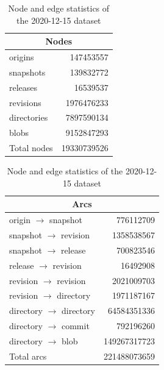\begin{table}
  \centering
  \caption{Node and edge statistics of the 2020-12-15 dataset}
  \label{tab:corpus-stats}
  \begin{tabular}[t]{l|r}
    \multicolumn{2}{c}{\textbf{Nodes}} \\
    \hline\hline
    origins     & \num{147453557} \\
    snapshots   & \num{139832772} \\
    releases    & \num{16539537} \\
    revisions   & \num{1976476233} \\
    directories & \num{7897590134} \\
    blobs       & \num{9152847293} \\
    \hline
    Total nodes & \num{19330739526} \\
  \end{tabular}
  \hspace{5mm}
  \begin{tabular}[t]{l|r}
    \multicolumn{2}{c}{\textbf{Arcs}} \\
    \hline\hline
    origin    $\to$ snapshot  & \num{776112709} \\
    snapshot  $\to$ revision  & \num{1358538567} \\
    snapshot  $\to$ release   & \num{700823546} \\
    release   $\to$ revision  & \num{16492908} \\
    revision  $\to$ revision  & \num{2021009703} \\
    revision  $\to$ directory & \num{1971187167} \\
    directory $\to$ directory & \num{64584351336} \\
    directory $\to$ commit    & \num{792196260} \\
    directory $\to$ blob      & \num{149267317723} \\
    \hline
    Total arcs                & \num{221488073659} \\
  \end{tabular}
\end{table}

